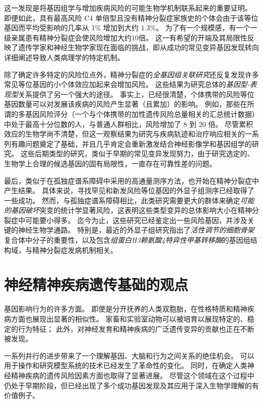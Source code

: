 这一发现是将基因组学与增加疾病风险的可能生物学机制联系起来的重要证明。
即便如此，具有最高风险 C4 单倍型且没有精神分裂症家族史的个体会由于该等位基因而平均受影响的几率从 1\% 增加到大约 1.3\%。
为了有一个规模感，有一个一级亲属患有精神分裂症会使风险增加大约10倍。
这一有希望的开端及其局限性反映了遗传学家和神经生物学家现在面临的挑战，即从成功的常见变异基因发现转向详细阐述导致人类病理学的特定机制。


除了确定许多特定的风险位点外，精神分裂症的\textit{全基因组关联研究}还反复发现许多常见等位基因的小个体效应加起来会增加风险。
这些结果为研究总体的\textit{基因型-表现型}关系提供了另一个强大的途径。
事实上，已经很清楚，个体携带的风险等位基因数量可以对发展该疾病的风险产生显著（且累加）的影响。
例如，那些在所谓的多基因风险评分（一个与个体携带的加性遗传风险总量相关的汇总统计数据）中处于最高十分位数的人，与普通人群相比，风险增加了 8 到 20 倍。
尽管累积效应的生物学尚不清楚，但这一观察结果为研究与疾病轨迹和治疗响应相关的一系列有趣问题奠定了基础，并且几乎肯定会重新激发结合神经影像学和基因组学的研究。
这些后期类型的研究，类似于早期的常见变异发现努力，由于研究选定的、生物学上合理的候选基因的固有局限性，一直存在可靠性差的问题。


最后，类似于在孤独症谱系障碍中采用的高通量测序方法，也开始在精神分裂症中产生结果。
具体来说，寻找罕见和新发风险等位基因的外显子组测序已经取得了一些成功。
然而，与孤独症谱系障碍相比，此类研究需要更大的群体来确定\textit{可能的基因破坏}突变的统计学显著风险，这表明这些类型变异的总体影响大小在精神分裂症中可能要小得多。
迄今为止，这些研究已经鉴定出一些风险基因，并涉及关键的神经生物学通路。
特别是，最近的外显子组研究指出了\textit{活性调节的细胞骨架}复合体中分子的重要性，以及包含\textit{组蛋白H3赖氨酸4特异性甲基转移酶}的基因组结构域，与精神分裂症发病机制相关。


\section{神经精神疾病遗传基础的观点}

基因影响行为的许多方面。
即使是分开抚养的人类双胞胎，在性格特质和精神疾病方面也展现出显著的相似性。
家畜和实验室动物可以被培育以展现特定的、稳定的行为特征；
此外，对神经发育和精神疾病的广泛遗传变异的贡献也正在不断被发现。


一系列并行的进步带来了一个理解基因、大脑和行为之间关系的绝佳机会。
可以用于操作和研究模型系统的技术已经发生了革命性的变化。
同时，在确定人类神经精神疾病的遗传风险因素方面也取得了显著进展。
尽管这个领域在这个过程中仍处于早期阶段，但已经出现了多个成功基因发现及其应用于深入生物学理解的有价值例子。


